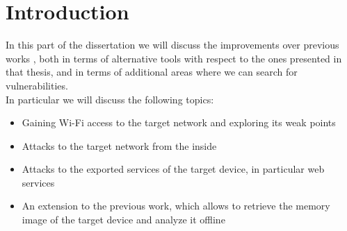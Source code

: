 \chapter{Introduction}
In this part of the dissertation we will discuss the improvements over
previous works \cite{previouswork}, both in terms of alternative tools
with respect to the ones presented in that thesis, and in terms of additional
areas where we can search for vulnerabilities.\\
In particular we will discuss the following topics:
\begin{itemize}
    \item Gaining Wi-Fi access to the target network and exploring its weak points
    \item Attacks to the target network from the inside
    \item Attacks to the exported services of the target device, in particular web services
    \item An extension to the previous work, which allows to retrieve the memory
        image of the target device and analyze it offline
\end{itemize}
\newpage
